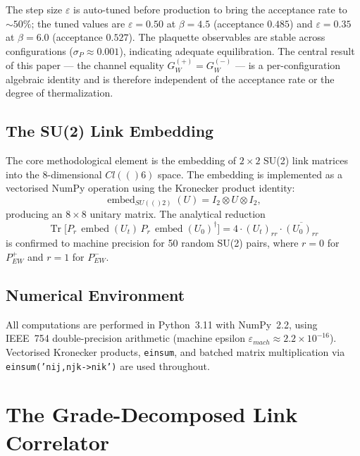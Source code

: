 \documentclass[12pt,a4paper]{article}
\newcommand{\Cl}{\mathrm{Cl}}
\newcommand{\SU}{\mathrm{SU}}
\newcommand{\Tr}{\operatorname{Tr}}
\newcommand{\embed}{\operatorname{embed}}
\newcommand{\Id}[1]{I_{#1}}
\newcommand{\Pew}[1]{P^{#1}_{\mathrm{EW}}}
\def\Cl#1{Cl(#1)}%
\def\SU#1{SU(#1)}%
\def\mathrm#1{#1}%
\begin{document}
	The step size $\varepsilon$ is auto-tuned before production to bring the
	acceptance rate to ${\sim}50\%$; the tuned values are $\varepsilon=0.50$ at
	$\beta=4.5$ (acceptance $0.485$) and $\varepsilon=0.35$ at $\beta=6.0$
	(acceptance $0.527$).  The plaquette observables are stable across configurations
	($\sigma_P\approx0.001$), indicating adequate equilibration.  The central result of
	this paper --- the channel equality $G_W^{(+)}=G_W^{(-)}$ --- is a per-configuration
	algebraic identity and is therefore independent of the acceptance rate or the degree
	of thermalization.

	
	\subsection{The SU(2) Link Embedding}
	
	The core methodological element is the embedding of $2\times2$ SU(2) link matrices
	into the 8-dimensional $\Cl(6)$ space.  The embedding is implemented as a
	vectorised NumPy operation using the Kronecker product identity:
	\begin{equation}
		\embed_{\SU(2)}(U) = \Id{2}\otimes U\otimes\Id{2},
	\end{equation}
	producing an $8\times8$ unitary matrix.  The analytical reduction
	\begin{equation}\label{eq:reduction}
		\Tr\!\bigl[P_r\,\embed(U_t)\,P_r\,\embed(U_0)^\dagger\bigr]
		= 4\cdot(U_t)_{rr}\cdot\overline{(U_0)_{rr}}
	\end{equation}
	is confirmed to machine precision for 50 random SU(2) pairs, where $r=0$ for
	$\Pew{+}$ and $r=1$ for $\Pew{-}$.
	
	\subsection{Numerical Environment}
	
	All computations are performed in Python~3.11 with NumPy~2.2, using IEEE~754
	double-precision arithmetic (machine epsilon
	$\varepsilon_{\mathrm{mach}}\approx2.2\times10^{-16}$).  Vectorised Kronecker
	products, \texttt{einsum}, and batched matrix multiplication via
	\texttt{einsum('nij,njk->nik')} are used throughout.
	
	\section{The Grade-Decomposed Link Correlator}
	
\end{document}
